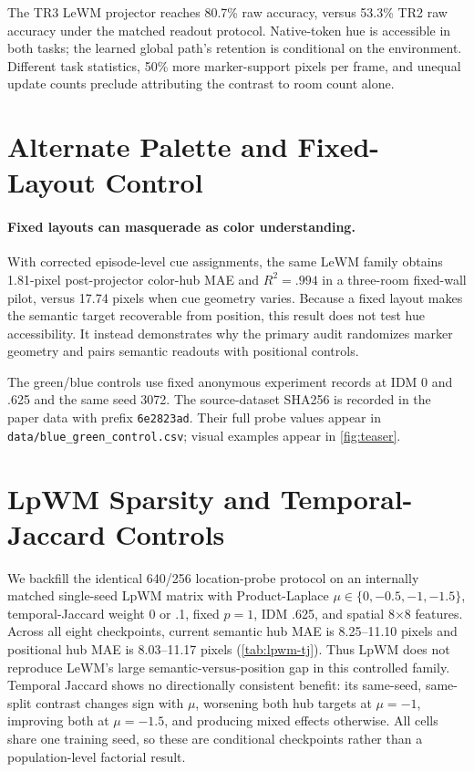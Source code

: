 \documentclass{article}
\begin{document}
The TR3 LeWM projector reaches 80.7\% raw accuracy, versus 53.3\% TR2 raw
accuracy under the matched readout protocol.  Native-token hue is accessible
in both tasks; the learned
global path's retention is conditional on the environment.  Different task
statistics, 50\% more marker-support pixels per frame, and unequal update
counts preclude attributing the contrast to room count alone.

\section{Alternate Palette and Fixed-Layout Control}

\paragraph{Fixed layouts can masquerade as color understanding.}
With corrected episode-level cue assignments, the same LeWM family obtains
1.81-pixel post-projector color-hub MAE and $R^2=.994$ in a three-room
fixed-wall pilot, versus 17.74 pixels when cue geometry varies.  Because a
fixed layout makes the semantic target recoverable from position, this result
does not test hue accessibility.  It instead demonstrates why the primary audit
randomizes marker geometry and pairs semantic readouts with positional controls.

The green/blue controls use fixed anonymous experiment records at IDM 0 and .625 and the same seed
3072.  The source-dataset SHA256 is recorded in the paper data with prefix
\texttt{6e2823ad}.
Their full probe values appear in \texttt{data/blue\_green\_control.csv}; visual
examples appear in \cref{fig:teaser}.

\section{LpWM Sparsity and Temporal-Jaccard Controls}

We backfill the identical 640/256 location-probe protocol on an internally matched
single-seed LpWM matrix with Product-Laplace
$\mu\in\{0,-0.5,-1,-1.5\}$, temporal-Jaccard weight 0 or .1, fixed $p=1$,
IDM .625, and spatial 8$\times$8 features.  Across all eight checkpoints,
current semantic hub MAE is 8.25--11.10 pixels and positional hub MAE is
8.03--11.17 pixels (\cref{tab:lpwm-tj}).  Thus LpWM does not reproduce LeWM's
large semantic-versus-position gap in this controlled family.  Temporal
Jaccard shows no directionally consistent benefit: its same-seed, same-split contrast
changes sign with $\mu$, worsening both hub targets at $\mu=-1$, improving both
at $\mu=-1.5$, and producing mixed effects otherwise.  All cells share one
training seed, so these are conditional checkpoints rather than a
population-level factorial result.
\end{document}
